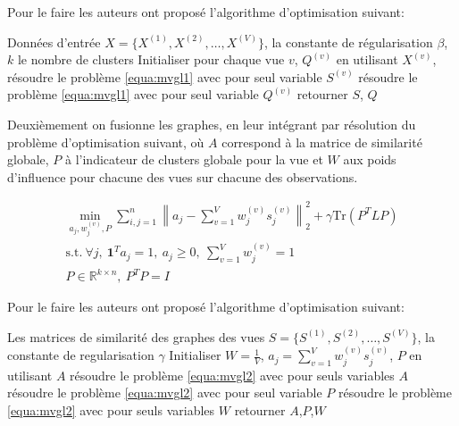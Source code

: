 \documentclass[12pt, french, latin.medieval, a4paper]{report}
\begin{document}
	Pour le faire les auteurs ont proposé l'algorithme d'optimisation suivant:
	\begin{algorithm}[H]
        \caption{Algorithme d'apprentissage des graphes pour chaque vue \cite{zhan2017graph}}
        \label{alg:mvgl1}
        \begin{algorithmic}[1]
        \REQUIRE Données d'entrée $X = \{ X^{(1)}, X^{(2)},\dots,X^{(V)} \}$, la constante de régularisation $\beta$, $k$ le nombre de clusters
        \STATE Initialiser pour chaque vue $v$, $Q^{(v)}$ en utilisant $X^{(v)}$, 
	        \REPEAT
				\STATE résoudre le problème \ref{equa:mvgl1} avec pour seul variable $S^{(v)}$
	            \STATE résoudre le problème \ref{equa:mvgl1} avec pour seul variable $Q^{(v)}$
		\ENDFOR
        \STATE retourner $S$, $Q$
        \end{algorithmic}
    \end{algorithm}

	Deuxièmement on fusionne les graphes, en leur intégrant par résolution du problème d'optimisation suivant, où 
	$A$ correspond à la matrice de similarité globale, 
    $P$ à l'indicateur de clusters globale pour la vue et 
	$W$ aux poids d'influence pour chacune des vues sur chacune des observations.

    \begin{equation}
    	\begin{aligned}
        	\min_{a_j,w_j^{(v)},P}  \sum_{i,j=1}^n {\left\| a_j - \sum_{v=1}^V w_j^{(v)}s_j^{(v)}\right\|}_2^2 + \gamma \text{Tr}(P^TLP)
            \\ \text{s.t.}\ \forall j,\ \textbf{1}^Ta_j = 1,\ a_j\geq0,\ \sum_{v=1}^V w_j^{(v)} = 1
            \\ P \in \mathbb{R}^{k \times n} ,\ P^TP = I
        \end{aligned}
		\label{equa:mvgl2}
	\end{equation}
    
	Pour le faire les auteurs ont proposé l'algorithme d'optimisation suivant:
	
	\begin{algorithm}[H]
        \caption{Algorithme d'apprentissage du graphe globale \cite{zhan2017graph} }
        \label{alg:mcles1}
        \begin{algorithmic}[1]
        \REQUIRE Les matrices de similarité des graphes des vues $S = \{ S^{(1)}, S^{(2)},\dots,S^{(V)} \}$, la constante de regularisation $\gamma$
        \STATE Initialiser $W = \frac{1}{V}$, $a_j = \sum_{v=1}^V w_j^{(v)}s_j^{(v)}$, $P$ en utilisant $A$ 
            \REPEAT
                \STATE résoudre le problème \ref{equa:mvgl2} avec pour seuls variables $A$
                \STATE résoudre le problème \ref{equa:mvgl2} avec pour seul variable $P$
		      \STATE résoudre le problème \ref{equa:mvgl2} avec pour seuls variables $W$
        \ENDWHILE
        \STATE retourner $A$,$P$,$W$
        \end{algorithmic}
    \end{algorithm}
    
\end{document}
